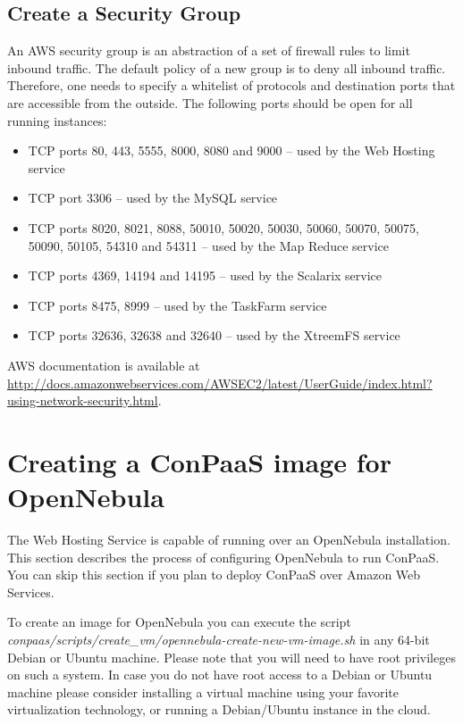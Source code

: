 \documentclass[10pt]{article}
\begin{document}
\subsection{Create a Security Group}
\label{sec:secgroup}

An AWS security group is an abstraction of a set of firewall rules to
limit inbound traffic. The default policy of a new group is to deny
all inbound traffic. Therefore, one needs to specify a whitelist of
protocols and destination ports that are accessible from the outside. 
The following ports should be open for all running instances: 
\begin{itemize}
\item TCP ports 80, 443, 5555, 8000, 8080 and 9000 -- used by the Web Hosting service
\item TCP port 3306 -- used by the MySQL service
\item TCP ports 8020, 8021, 8088, 50010, 50020, 50030, 50060, 50070, 50075, 50090, 50105, 54310 and 54311 -- used by the Map Reduce service
\item TCP ports 4369, 14194 and 14195 -- used by the Scalarix service
\item TCP ports 8475, 8999 -- used by the TaskFarm service
\item TCP ports 32636, 32638 and 32640 -- used by the XtreemFS service
\end{itemize}

AWS documentation is available at
\url{http://docs.amazonwebservices.com/AWSEC2/latest/UserGuide/index.html?using-network-security.html}.

\section{Creating a ConPaaS image for OpenNebula}
\label{sec:oneimage}

The Web Hosting Service is capable of running over an OpenNebula
installation. This section describes the process of configuring
OpenNebula to run ConPaaS. You can skip this section if you plan to
deploy ConPaaS over Amazon Web Services.

To create an image for OpenNebula you can execute the script\\
\textit{conpaas/scripts/create\_vm/opennebula-create-new-vm-image.sh}
in any 64-bit Debian or Ubuntu machine. Please note that you will need to have
root privileges on such a system. In case you do not have root access to a
Debian or Ubuntu machine please consider installing a virtual machine using
your favorite virtualization technology, or running a Debian/Ubuntu instance in
the cloud.
\end{document}
